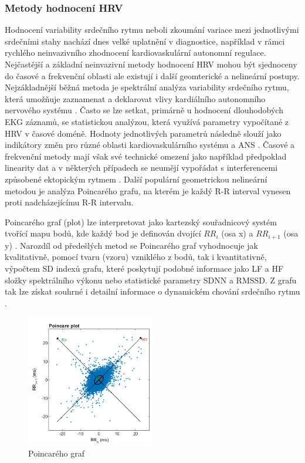 \subsubsection{Metody hodnocení HRV}
Hodnocení variability srdečního rytmu neboli zkoumání variace mezi jednotlivými
srdečními stahy nachází dnes velké uplatnění v diagnostice, například v rámci
rychlého neinvazivního zhodnocení kardiovaskulární autonomní regulace.
Nejčastější a základní neinvazivní metody hodnocení HRV mohou být sjednoceny do
časové a frekvenční oblasti ale existují i další geomterické a nelineární
postupy. Nejzákladnější běžná metoda je spektrální analýza variability srdečního
rytmu, která umožňuje zaznamenat a deklarovat vlivy kardiálního autonomního
nervového systému \cite{Pumprla2014}. Často se lze setkat, primárně u hodnocení
dlouhodobých EKG záznamů, se statistickou analýzou, která využívá parametry
vypočítané z HRV v časové doméně. Hodnoty jednotlivých parametrů následně slouží
jako indikátory změn pro různé oblasti kardiovaskulárního systému a ANS
\cite{Malik1996}. Časové a frekvenční metody mají však své technické omezení
jako například předpoklad linearity dat a v některých případech se neumějí
vypořádat s interferencemi způsobené ektopickým rytmem \cite{Hsu2012}. Další
populární geometrickou nelineární metodou je analýza Poincarého grafu, na kterém
je každý R-R interval vynesen proti nadcházejícímu R-R intervalu. 

Poincarého graf (plot) lze interpretovat jako kartezský souřadnicový systém
tvořící mapu bodů, kde každý bod je definován dvojící $RR_i$ (osa x) a
$RR_{i+1}$ (osa y) \cite{Hsu2012,Hejjel2001}. Narozdíl od předešlých metod se
Poincarého graf vyhodnocuje jak kvalitativně, pomocí tvaru (vzoru) vzniklého z
bodů, tak i kvantitativně, výpočtem SD indexů grafu, které poskytují podobné
informace jako LF a HF složky spektrálního výkonu nebo statistické parametry
SDNN a RMSSD. Z grafu tak lze získat souhrné i detailní informace o dynamickém
chování srdečního rytmu \cite{Hsu2012,Kubickova2016}. 

\begin{figure}[h]
	\begin{center}
		\includegraphics[width=0.5\textwidth]{../assets/figures/wiki_poincare}
		\caption{Poincarého graf \cite{wikiPoincare}}
		\label{fig:wiki_poincare}
	\end{center}
\end{figure}

